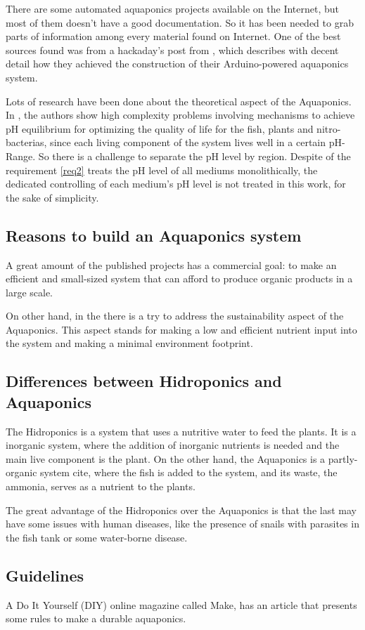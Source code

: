 There are some automated aquaponics projects available on the Internet,
but most of them doesn't have a good documentation.
So it has been needed to grab parts of information among every material found on Internet.
One of the best sources found was from a hackaday's post from \cite{GarethColeman2014},
which describes with decent detail how they achieved the construction of their Arduino-powered aquaponics system.

Lots of research have been done about the theoretical aspect of the Aquaponics.
In \cite{GoddekDelaideMankasinghEtAl2015},
the authors show high complexity problems involving mechanisms to achieve pH equilibrium for optimizing the quality of life for the fish,
plants and nitro-bacterias,
since each living component of the system lives well in a certain pH-Range.
So there is a challenge to separate the pH level by region.
Despite of the requirement \ref{req2} treats the pH level of all mediums monolithically,
the dedicated controlling of each medium's pH level is not treated in this work,
for the sake of simplicity.

\subsection{Reasons to build an Aquaponics system}

A great amount of the published projects has a commercial goal:
to make an efficient and small-sized system that can afford to produce organic products in a large scale.

On other hand,
in the \cite{GoddekDelaideMankasinghEtAl2015} there is a try to address the sustainability aspect of the Aquaponics.
This aspect stands for making a low and efficient nutrient input into the system and making a minimal environment footprint.

\subsection{Differences between Hidroponics and Aquaponics}

The Hidroponics is a system that uses a nutritive water to feed the plants.
It is a inorganic system, 
where the addition of inorganic nutrients is needed and the main live component is the plant.
On the other hand, the Aquaponics is a partly-organic system cite,
where the fish is added to the system,
and its waste,
the ammonia,
serves as a nutrient to the plants.

The great advantage of the Hidroponics over the Aquaponics is that the last may have some issues with human diseases,
like the presence of snails with parasites in the fish tank or some water-borne disease.

\subsection{Guidelines}
A Do It Yourself (DIY) online magazine called Make,
has an article  that presents some rules to make a durable aquaponics.
